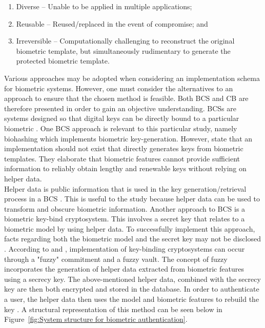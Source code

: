 \begin{enumerate}[label=\roman*.]
	\item Diverse – Unable to be applied in multiple applications;
	\item Reusable – Reused/replaced in the event of compromise; and
	\item Irreversible – Computationally challenging to reconstruct the original biometric template, but simultaneously rudimentary to generate the protected biometric template.
\end{enumerate}

Various approaches may be adopted when considering an implementation schema for biometric systems. However, one must consider the alternatives to an approach to ensure that the chosen method is feasible. Both BCS and CB are therefore presented in order to gain an objective understanding. 
BCSs are systems designed so that digital keys can be directly bound to a particular biometric \citep{Rathgeb2011}. One BCS approach is relevant to this particular study, namely biohashing which implements biometric key-generation. However, \cite{Rathgeb2011} state that an implementation should not exist that directly generates keys from biometric templates. They elaborate that biometric features cannot provide sufficient information to reliably obtain lengthy and renewable keys without relying on helper data. \\

Helper data is public information that is used in the key generation/retrieval process in a BCS \citep{Rathgeb2011}.  This is useful to the study because helper data can be used to transform and obscure biometric information. Another approach to BCS is a biometric key-bind cryptosystem. This involves a secret key that relates to a biometric model by using helper data. To successfully implement this approach, facts regarding both the biometric model and the secret key may not be disclosed \citep{Eng2016}. According to \cite{Paul2014} and \cite{Rathgeb2011}, implementation of key-binding cryptosystems can occur through a "fuzzy" commitment and a fuzzy vault. The concept of fuzzy incorporates the generation of helper data extracted from biometric features using a secrecy key. The above-mentioned helper data, combined with the secrecy key are then both encrypted and stored in the database. In order to authenticate a user, the helper data then uses the model and biometric features to rebuild the key \citep{Eng2016}. A structural representation of this method can be seen below in Figure~\ref{fig:System structure for biometric authentication}.

